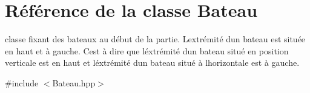 \hypertarget{class_bateau}{}\section{Référence de la classe Bateau}
\label{class_bateau}


classe fixant des bateaux au début de la partie. L\textquotesingle{}extrémité d\textquotesingle{}un bateau est située en haut et à gauche. C\textquotesingle{}est à dire que l\textquotesingle{}éxtrémité d\textquotesingle{}un bateau situé en position verticale est en haut et l\textquotesingle{}éxtrémité d\textquotesingle{}un bateau situé à l\textquotesingle{}horizontale est à gauche.  




{\ttfamily \#include $<$Bateau.\+hpp$>$}

